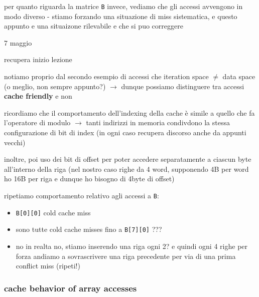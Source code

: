  per quanto riguarda la matrice \lstinline|B| invece, vediamo che gli accessi avvengono in modo diverso - stiamo forzando una situazione di miss sistematica, e questo appunto e una situaizone rilevabile e che si puo correggere

7 maggio

recupera inizio lezione

notiamo proprio dal secondo esempio di accessi che iteration space $\neq$ data space (o meglio, non sempre appunto?) $\rightarrow$ dunque possiamo distinguere tra accessi \textbf{cache friendly} e non

\begin{emphasize}
    ricordiamo che il comportamento dell'indexing della cache \`e simile a quello che fa l'operatore di modulo $\rightarrow$ tanti indirizzi in memoria condivdono la stessa configurazione di bit di index (in ogni caso recupera discorso anche da appunti vecchi)

    inoltre, poi uso dei bit di offset per poter accedere separatamente a ciascun byte all'interno della riga (nel nostro caso righe da 4 word, supponendo 4B per word ho 16B per riga e dunque ho bisogno di 4byte di offset)
\end{emphasize}


ripetiamo comportamento relativo agli accessi a \lstinline|B|:
\begin{itemize}
  \item \lstinline|B[0][0]| cold cache miss
  \item sono tutte cold cache misses fino a \lstinline|B[7][0]| ???
  \item no in realta no, stiamo inserendo una riga ogni 2? e quindi ogni 4 righe per forza andiamo a sovrascrivere una riga precedente per via di una prima conflict miss (ripeti!)
\end{itemize}

\subsubsection{cache behavior of array accesses}

